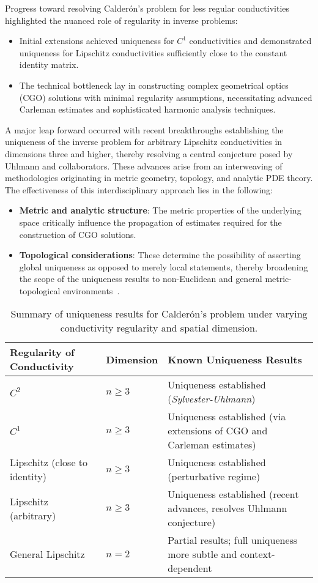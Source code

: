 \documentclass[11pt]{article}
\begin{document}
Progress toward resolving Calderón's problem for less regular conductivities highlighted the nuanced role of regularity in inverse problems:

\begin{itemize}
    \item Initial extensions achieved uniqueness for $C^1$ conductivities and demonstrated uniqueness for Lipschitz conductivities sufficiently close to the constant identity matrix.
    \item The technical bottleneck lay in constructing complex geometrical optics (CGO) solutions with minimal regularity assumptions, necessitating advanced Carleman estimates and sophisticated harmonic analysis techniques.
\end{itemize}

A major leap forward occurred with recent breakthroughs establishing the uniqueness of the inverse problem for arbitrary Lipschitz conductivities in dimensions three and higher, thereby resolving a central conjecture posed by Uhlmann and collaborators. These advances arise from an interweaving of methodologies originating in metric geometry, topology, and analytic PDE theory. The effectiveness of this interdisciplinary approach lies in the following:

\begin{itemize}
    \item \textbf{Metric and analytic structure}: The metric properties of the underlying space critically influence the propagation of estimates required for the construction of CGO solutions.
    \item \textbf{Topological considerations}: These determine the possibility of asserting global uniqueness as opposed to merely local statements, thereby broadening the scope of the uniqueness results to non-Euclidean and general metric-topological environments~\cite{ref102}.
\end{itemize}

\begin{table}[ht]
    \centering
    \begin{tabular}{|l|l|p{7cm}|}
        \hline
        \textbf{Regularity of Conductivity} & \textbf{Dimension} & \textbf{Known Uniqueness Results} \\
        \hline
        $C^2$ & $n \geq 3$ & Uniqueness established (\textit{Sylvester-Uhlmann}) \\
        $C^1$ & $n \geq 3$ & Uniqueness established (via extensions of CGO and Carleman estimates) \\
        Lipschitz (close to identity) & $n \geq 3$ & Uniqueness established (perturbative regime) \\
        Lipschitz (arbitrary) & $n \geq 3$ & Uniqueness established (recent advances, resolves Uhlmann conjecture) \\
        General Lipschitz & $n = 2$ & Partial results; full uniqueness more subtle and context-dependent \\
        \hline
    \end{tabular}
    \caption{Summary of uniqueness results for Calderón's problem under varying conductivity regularity and spatial dimension.}
    \label{tab:calderon_uniqueness}
\end{table}
\end{document}
